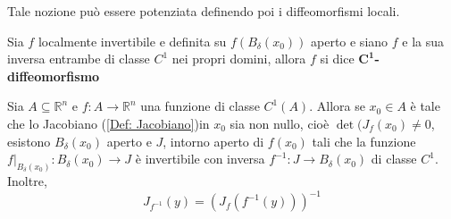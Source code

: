 Tale nozione può essere potenziata definendo poi i diffeomorfismi locali.
\begin{definition} \label{Def: Diffeomorfismo}
    Sia $f$ localmente invertibile e definita su $f(B_\delta(x_0))$ aperto e siano $f$ e la sua inversa entrambe di classe $C^1$ nei propri domini, allora $f$ si dice $\mathbf{C^1}$\textbf{-diffeomorfismo}
\end{definition}
\begin{theorem} \label{Teo: Invertibilità locale}
    Sia $A \subseteq \mathbb{R}^n$ e $f: A \to \mathbb{R}^n$ una funzione di classe $C^1(A)$. Allora se $x_0 \in A$ è tale che lo Jacobiano (\ref{Def: Jacobiano})in $x_0$ sia non nullo, cioè $\det(J_f(x_0) \neq 0$, esistono $B_\delta(x_0)$ aperto e $J$, intorno aperto di $f(x_0)$ tali che la funzione $f\big|_{B_\delta(x_0)}: B_\delta(x_0) \to J$ è invertibile con inversa $f^{-1}: J \to B_\delta(x_0)$ di classe $C^1$. Inoltre, 
    \begin{equation*}
        J_{f^{-1}}(y)=(J_f(f^{-1}(y)))^{-1}
    \end{equation*}
\end{theorem}

